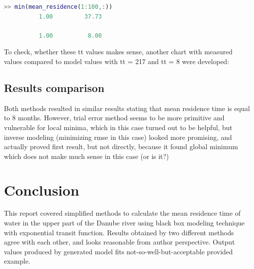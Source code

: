 \documentclass[onecolumn]{article}
\begin{document}
\newpage
\begin{lstlisting}[language=Matlab,frame=single,label={lst:autocorr},breaklines=true,caption={Convolutional integral implementation with exponential transit function}]
% check for local minimum at the beginning
>> min(mean_residence(1:100,:))
          1.00         37.73

          1.00          8.00
\end{lstlisting}

To check, whether these tt values makes sense, another chart with measured values compared to model values with tt = 217 and tt = 8 were developed:
\noindent{}

\subsection{Results comparison}
Both methods resulted in similar results stating that mean residence time is equal to 8 months. However, trial error method seems to be more primitive and vulnerable for local minima, which in this case turned out to be helpful, but inverse modeling (minimizing rmse in this case) looked more promising, and actually proved first result, but not directly, because it found global minimum which does not make much sense in this case (or is it?)

\section{Conclusion}
This report covered simplified methods to calculate the mean residence time of water in the upper part of the Danube river using black box modeling technique with exponential transit function. Results obtained by two different methods agree with each other, and looks reasonable from author perspective. Output values produced by generated model fits not-so-well-but-acceptable provided example.
\end{document}
